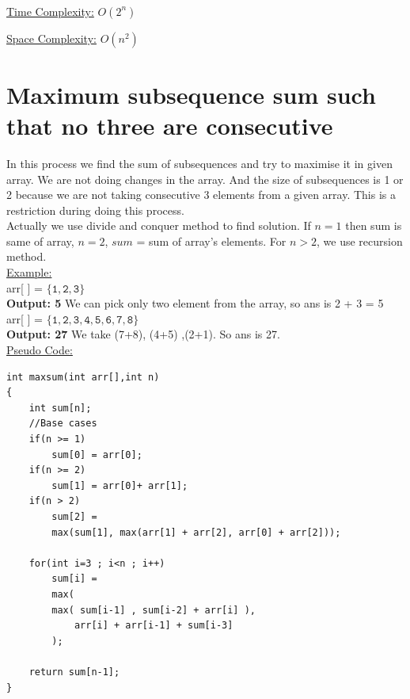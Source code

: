 \documentclass[12pt]{book}
\begin{document}
\underline{\\Time Complexity:}  $O(2^n)$\newline

\underline{Space Complexity:}  $O(n^2)$\newline

\chapter{Maximum subsequence sum such that no three are consecutive}
In this process we find the sum of subsequences and try to maximise it in given array. We are not  doing changes in the array. And the size of subsequences is 1 or 2 because we are not taking consecutive 3 elements from a given array. This is a restriction during doing this process.\\
Actually we use divide and conquer method to find solution. If $n = 1$ then sum is same of array, $n = 2$, $sum$ = sum of array’s elements. For $n > 2$, we use recursion method.\\

\underline{Example:}\\
arr[ ] = $\mathtt{\{ 1, 2, 3 \}}$\\
\textbf{Output: 5}
\newline
\newline
We can pick only two element from the array, so ans is 2 + 3 = 5\\

arr[ ] = $\mathtt{\{ 1, 2, 3, 4, 5, 6, 7, 8 \}}$\\
\textbf{Output: 27}
\newline
\newline
We take (7+8), (4+5) ,(2+1). So ans is 27.\\

\underline{Pseudo Code:}\\

\begin{lstlisting}
int maxsum(int arr[],int n)
{
    int sum[n];
    //Base cases
    if(n >= 1)
        sum[0] = arr[0];
    if(n >= 2)
        sum[1] = arr[0]+ arr[1];
    if(n > 2)
        sum[2] =
        max(sum[1], max(arr[1] + arr[2], arr[0] + arr[2]));

    for(int i=3 ; i<n ; i++)
        sum[i] =
        max(
        max( sum[i-1] , sum[i-2] + arr[i] ),
            arr[i] + arr[i-1] + sum[i-3]
        );
	
    return sum[n-1];
}
\end{lstlisting}
\end{document}

